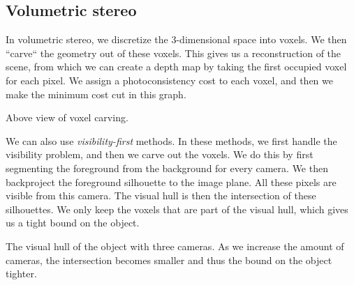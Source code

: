 \subsection{Volumetric stereo}

In volumetric stereo, we discretize the 3-dimensional space into
voxels. We then ``carve``
the geometry out of these voxels. This gives us a reconstruction of the scene,
from which we can create a depth map by taking the first occupied voxel for
each pixel. We assign a photoconsistency cost to each voxel, and then we make
the minimum cost cut in this graph.

\begin{marginfigure}
    \centering
    \caption{Above view of voxel carving.}
    \label{fig:voxel}
\end{marginfigure}

We can also use \textit{visibility-first} methods. In these methods, we first
handle the visibility problem, and then we carve out the voxels. We do this by
first segmenting the foreground from the background for every camera. We then
backproject the foreground silhouette to the image plane. All these pixels are
visible from this camera. The visual hull is then the intersection of these
silhouettes. We only keep the voxels that are part of the visual hull, which
gives us a tight bound on the object.

\begin{marginfigure}[0.5cm]
    \centering
    \caption{The visual hull of the object with three cameras. As we increase
        the amount of cameras, the intersection becomes smaller and thus the bound
        on the object tighter.}
    \label{fig:visual-hull}
\end{marginfigure}
